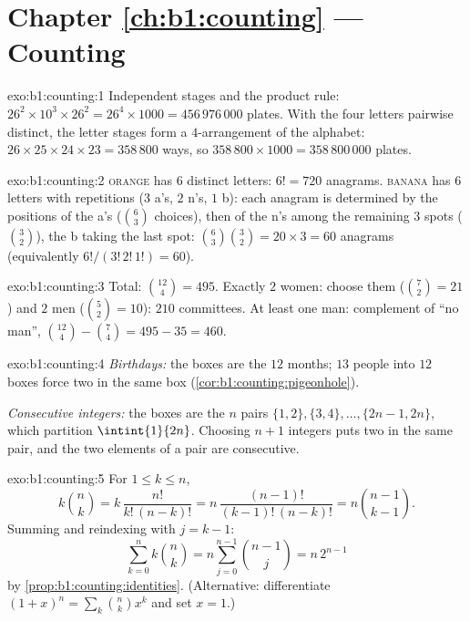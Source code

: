 \section*{Chapter \ref{ch:b1:counting} --- Counting}

\begin{solution}{exo:b1:counting:1}
Independent stages and the product rule: $26^2 \times 10^3 \times 26^2
= 26^4 \times 1000 = 456\,976\,000$ plates. With the four letters
pairwise distinct, the letter stages form a $4$-arrangement of the
alphabet: $26 \times 25 \times 24 \times 23 = 358\,800$ ways, so
$358\,800 \times 1000 = 358\,800\,000$ plates.
\end{solution}

\begin{solution}{exo:b1:counting:2}
\textsc{orange} has $6$ distinct letters: $6! = 720$ anagrams.
\textsc{banana} has $6$ letters with repetitions ($3$ a's, $2$ n's,
$1$ b): each anagram is determined by the positions of the a's
($\binom 63$ choices), then of the n's among the remaining $3$ spots
($\binom 32$), the b taking the last spot:
$\binom{6}{3}\binom{3}{2} = 20 \times 3 = 60$ anagrams
(equivalently $6!/(3!\,2!\,1!) = 60$).
\end{solution}

\begin{solution}{exo:b1:counting:3}
Total: $\binom{12}{4} = 495$. Exactly $2$ women: choose them
($\binom 72 = 21$) and $2$ men ($\binom 52 = 10$): $210$ committees.
At least one man: complement of ``no man'',
$\binom{12}{4} - \binom{7}{4} = 495 - 35 = 460$.
\end{solution}

\begin{solution}{exo:b1:counting:4}
\emph{Birthdays:} the boxes are the $12$ months; $13$ people into $12$
boxes force two in the same box
(\cref{cor:b1:counting:pigeonhole}).

\emph{Consecutive integers:} the boxes are the $n$ pairs $\{1,2\},
\{3,4\}, \dots, \{2n-1, 2n\}$, which partition $\intint{1}{2n}$.
Choosing $n + 1$ integers puts two in the same pair, and the two
elements of a pair are consecutive.
\end{solution}

\begin{solution}{exo:b1:counting:5}
For $1 \leq k \leq n$,
\[
k \binom nk = k\,\frac{n!}{k!\,(n-k)!}
= n\,\frac{(n-1)!}{(k-1)!\,(n-k)!} = n \binom{n-1}{k-1}.
\]
Summing and reindexing with $j = k - 1$:
\[
\sum_{k=0}^{n} k \binom nk = n \sum_{j=0}^{n-1} \binom{n-1}{j}
= n\, 2^{n-1}
\]
by \cref{prop:b1:counting:identities}. (Alternative: differentiate
$(1+x)^n = \sum_k \binom nk x^k$ and set $x = 1$.)
\end{solution}

